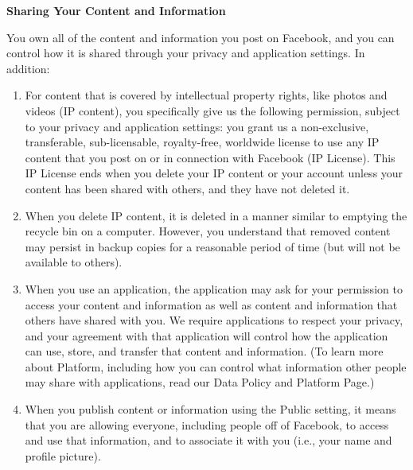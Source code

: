 \documentclass[showtrims,oldfontcommands]{kthesis}
\begin{document}
\begin{appendices}
\begin{quote_tos}
        \vspace{\baselineskip}

        \textbf{Sharing Your Content and Information}

        You own all of the content and information you post on Facebook, and you can control 
        how it is shared through your privacy and application settings. In addition:

        \begin{enumerate}
            \item For content that is covered by intellectual property rights, like photos 
            and videos (IP content), you specifically give us the following permission, 
            subject to your privacy and application settings: you grant us a non-exclusive, 
            transferable, sub-licensable, royalty-free, worldwide license to use any IP 
            content that you post on or in connection with Facebook (IP License). This IP 
            License ends when you delete your IP content or your account unless your content 
            has been shared with others, and they have not deleted it.
    
            \item When you delete IP content, it is deleted in a manner similar to emptying 
            the recycle bin on a computer. However, you understand that removed content 
            may persist in backup copies for a reasonable period of time (but will not be 
            available to others).
    
            \item When you use an application, the application may ask for your permission 
            to access your content and information as well as content and information that 
            others have shared with you.  We require applications to respect your privacy, 
            and your agreement with that application will control how the application can 
            use, store, and transfer that content and information.  (To learn more about 
            Platform, including how you can control what information other people may share 
            with applications, read our Data Policy and Platform Page.)
    
            \item When you publish content or information using the Public setting, it means 
            that you are allowing everyone, including people off of Facebook, to access 
            and use that information, and to associate it with you (i.e., your name and 
            profile picture).
    

\end{enumerate}
\end{quote_tos}
\end{appendices}
\end{document}
